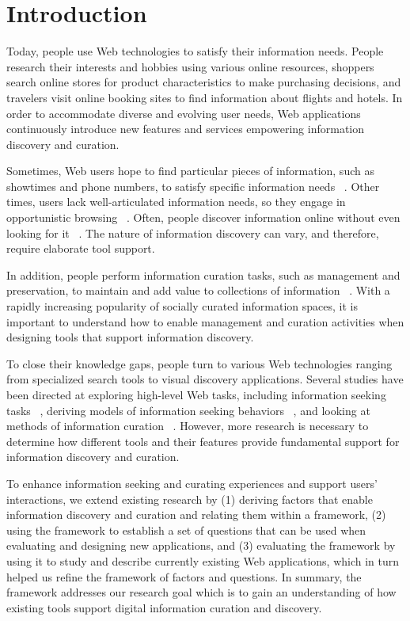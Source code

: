 \documentclass{casconpaper}
\begin{document}
{\section{Introduction}
Today, people use Web technologies to satisfy their information needs. People research their interests and hobbies using various online resources, shoppers search online stores for product characteristics to make purchasing decisions, and travelers visit online booking sites to find information about flights and hotels. In order to accommodate diverse and evolving user needs, Web applications continuously introduce new features and services empowering information discovery and curation. 

Sometimes, Web users hope to find particular pieces of information, such as showtimes and phone numbers, to satisfy specific information needs ~\cite{proper}. Other times, users lack well-articulated information needs, so they engage in opportunistic browsing ~\cite{lindley}. Often, people discover information online without even looking for it ~\cite{bates1986}. The nature of information discovery can vary, and therefore, require elaborate tool support.  

In addition, people perform information curation tasks, such as management and preservation, to maintain and add value to collections of information ~\cite{beagrie}. With a rapidly increasing popularity of socially curated information spaces, it is important to understand how to enable management and curation activities when designing tools that support information discovery.

To close their knowledge gaps, people turn to various Web technologies ranging from specialized search tools to visual discovery applications. Several studies have been directed at exploring high-level Web tasks, including information seeking tasks ~\cite{kellar2006, kellar2007, morrison, sellen}, deriving models of information seeking behaviors ~\cite{choo, ellis1989, ellis1993, ellis1997, bates1986, bates2002}, and looking at methods of information curation ~\cite{beagrie, wittaker}. However, more research is necessary to determine how different tools and their features provide fundamental support for information discovery and curation.

To enhance information seeking and curating experiences and support users' interactions, we extend existing research by (1) deriving factors that enable information discovery and curation and relating them within a framework, (2) using the framework to establish a set of questions that can be used when evaluating and designing new applications, and (3) evaluating the framework by using it to study and describe currently existing Web applications, which in turn helped us refine the framework of factors and questions. In summary, the framework addresses our research goal which is to gain an understanding of how existing tools support digital information curation and discovery. 

}
\end{document}

